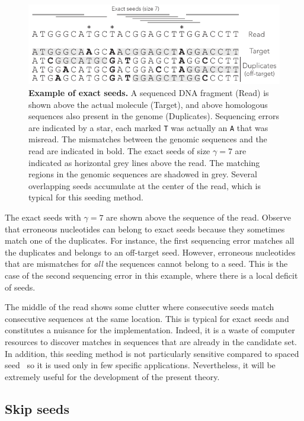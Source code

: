\documentclass{article}
\begin{document}
\begin{figure}[h]
\centering
\includegraphics[scale=1]{exact_seed_example.pdf}
\caption{\textbf{Example of exact seeds.}
A sequenced DNA fragment (Read) is shown above the actual molecule
(Target), and above homologous sequences also present in the genome
(Duplicates). Sequencing errors are indicated by a star, each marked
\texttt{T} was actually an \texttt{A} that was misread. The mismatches
between the genomic sequences and the read are indicated in bold. The
exact seeds of size $\gamma = 7$ are indicated as horizontal grey lines
above the read. The matching regions in the genomic sequences are
shadowed in grey. Several overlapping seeds accumulate at the center of
the read, which is typical for this seeding method.}
\label{fig:exact_seed_example}
\end{figure}

The exact seeds with $\gamma=7$ are shown above the sequence of the read.
Observe that erroneous nucleotides can belong to exact seeds because they
sometimes match one of the duplicates. For instance, the first sequencing
error matches all the duplicates and belongs to an off-target seed.
However, erroneous nucleotides that are mismatches for \emph{all} the
sequences cannot belong to a seed. This is the case of the second
sequencing error in this example, where there is a local deficit of seeds.

The middle of the read shows some clutter where consecutive seeds
match consecutive sequences at the same location. This is typical for
exact seeds and constitutes a nuisance for the implementation. Indeed, it
is a waste of computer resources to discover matches in sequences that are
already in the candidate set. In addition, this seeding method is not
particularly sensitive compared to spaced seed~\cite{pmid11934743} so it
is used only in few specific applications. Nevertheless, it will be
extremely useful for the development of the present theory.


\subsection{Skip seeds}
\end{document}
